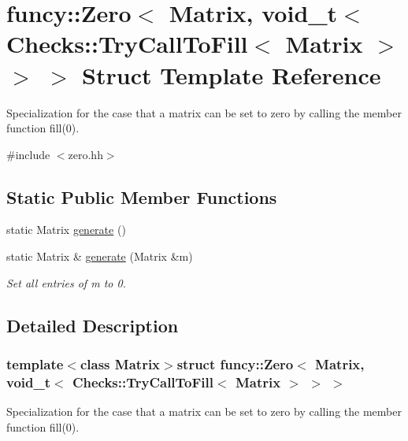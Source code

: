 \hypertarget{structfuncy_1_1Zero_3_01Matrix_00_01void__t_3_01Checks_1_1TryCallToFill_3_01Matrix_01_4_01_4_01_4}{\section{funcy\-:\-:Zero$<$ Matrix, void\-\_\-t$<$ Checks\-:\-:Try\-Call\-To\-Fill$<$ Matrix $>$ $>$ $>$ Struct Template Reference}
\label{structfuncy_1_1Zero_3_01Matrix_00_01void__t_3_01Checks_1_1TryCallToFill_3_01Matrix_01_4_01_4_01_4}
}


Specialization for the case that a matrix can be set to zero by calling the member function fill(0).  




{\ttfamily \#include $<$zero.\-hh$>$}

\subsection*{Static Public Member Functions}
\begin{DoxyCompactItemize}
\item 
static Matrix \hyperlink{structfuncy_1_1Zero_3_01Matrix_00_01void__t_3_01Checks_1_1TryCallToFill_3_01Matrix_01_4_01_4_01_4_ac132159c193ed66274821e51eb1ad9de}{generate} ()
\item 
static Matrix \& \hyperlink{structfuncy_1_1Zero_3_01Matrix_00_01void__t_3_01Checks_1_1TryCallToFill_3_01Matrix_01_4_01_4_01_4_ac0d4fa97b55d52b2b3d8a57de86ae1f5}{generate} (Matrix \&m)
\begin{DoxyCompactList}\small\item\em Set all entries of m to 0. \end{DoxyCompactList}\end{DoxyCompactItemize}


\subsection{Detailed Description}
\subsubsection*{template$<$class Matrix$>$struct funcy\-::\-Zero$<$ Matrix, void\-\_\-t$<$ Checks\-::\-Try\-Call\-To\-Fill$<$ Matrix $>$ $>$ $>$}

Specialization for the case that a matrix can be set to zero by calling the member function fill(0). 

